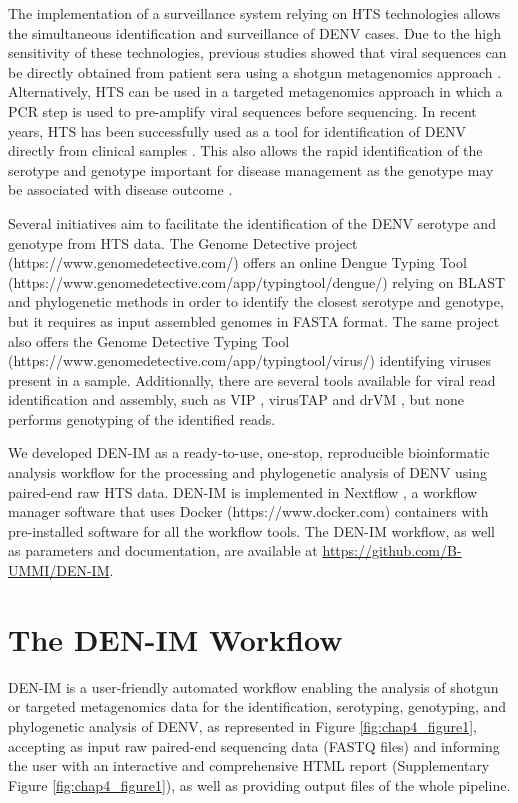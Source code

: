 The implementation of a surveillance system relying on HTS technologies allows the simultaneous identification and surveillance of DENV cases. Due to the high sensitivity of these technologies, previous studies showed that viral sequences can be directly obtained from patient sera using a shotgun metagenomics approach \citep{yozwiak_virus_2012}. Alternatively, HTS can be used in a targeted metagenomics approach in which a PCR step is used to pre-amplify viral sequences before sequencing. In recent years, HTS has been successfully used as a tool for identification of DENV directly from clinical samples \citep{yozwiak_virus_2012, lee_clinical_2017}. This also allows the rapid identification of the serotype and genotype important for disease management as the genotype may be associated with disease outcome \citep{fatima_serotype_2011}.

Several initiatives aim to facilitate the identification of the DENV serotype and genotype from HTS data. The Genome Detective project (https://www.genomedetective.com/) offers an online Dengue Typing Tool (https://www.genomedetective.com/app/typingtool/dengue/) \citep{fonseca_computational_2019} relying on BLAST and phylogenetic methods in order to identify the closest serotype and genotype, but it requires as input assembled genomes in FASTA format. The same project also offers the Genome Detective Typing Tool (https://www.genomedetective.com/app/typingtool/virus/) \citep{vilsker_genome_2019} identifying viruses present in a sample. Additionally, there are several tools available for viral read identification and assembly, such as VIP \citep{li_vip_2016}, virusTAP \citep{yamashita_virustap_2016} and drVM \citep{lin_drvm_2017}, but none performs genotyping of the identified reads.

We developed DEN-IM as a ready-to-use, one-stop, reproducible bioinformatic analysis workflow for the processing and phylogenetic analysis of DENV using paired-end raw HTS data. DEN-IM is implemented in Nextflow \citep{di_tommaso_nextflow_2017}, a workflow manager software that uses Docker (https://www.docker.com) containers with pre-installed software for all the workflow tools. The DEN-IM workflow, as well as parameters and documentation, are available at \url{https://github.com/B-UMMI/DEN-IM}.

\section{The DEN-IM Workflow}

DEN-IM is a user-friendly automated workflow enabling the analysis of shotgun or targeted metagenomics data for the identification, serotyping, genotyping, and phylogenetic analysis of DENV, as represented in Figure \ref{fig:chap4_figure1}, accepting as input raw paired-end sequencing data (FASTQ files) and informing the user with an interactive and comprehensive HTML report (Supplementary Figure \ref{fig:chap4_figure1}), as well as providing output files of the whole pipeline. 

